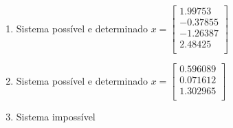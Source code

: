 \documentclass[a4paper]{article}
\begin{document}
\begin{enumerate}
\begin{enumerate}
  \item Sistema possível e determinado
    $x =
    \begin{bmatrix}
      1.99753\\
      -0.37855\\
      -1.26387\\
      2.48425\\
    \end{bmatrix}$

  \item Sistema possível e determinado
    $x =
    \begin{bmatrix}
      0.596089\\
      0.071612\\
      1.302965\\
    \end{bmatrix}$

  \item Sistema impossível


\end{enumerate}
\end{enumerate}
\end{document}
